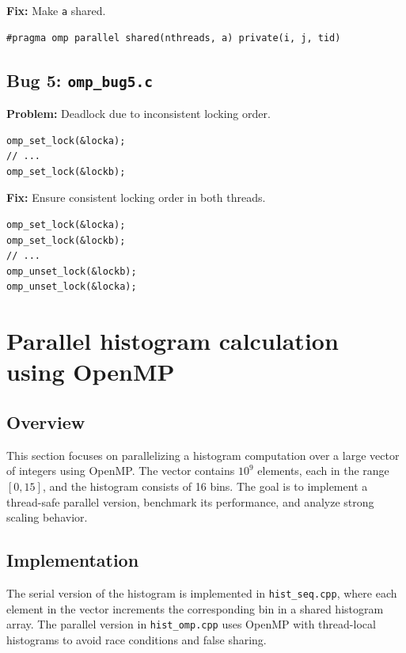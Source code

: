\documentclass[unicode,11pt,a4paper,oneside,numbers=endperiod,openany]{scrartcl}
\begin{document}
\textbf{Fix:} Make \texttt{a} shared.

\begin{lstlisting}[caption=Corrected Code]
#pragma omp parallel shared(nthreads, a) private(i, j, tid)
\end{lstlisting}

\subsection{Bug 5: \texttt{omp\_bug5.c}}

\textbf{Problem:} Deadlock due to inconsistent locking order.

\begin{lstlisting}[caption=Buggy Code]
omp_set_lock(&locka);
// ...
omp_set_lock(&lockb);
\end{lstlisting}

\textbf{Fix:} Ensure consistent locking order in both threads.

\begin{lstlisting}[caption=Corrected Code]
omp_set_lock(&locka);
omp_set_lock(&lockb);
// ...
omp_unset_lock(&lockb);
omp_unset_lock(&locka);
\end{lstlisting}

\newpage
\section{Parallel histogram calculation using OpenMP }

\subsection{Overview}
This section focuses on parallelizing a histogram computation over a large vector of integers using OpenMP. The vector contains $10^9$ elements, each in the range $[0, 15]$, and the histogram consists of 16 bins. The goal is to implement a thread-safe parallel version, benchmark its performance, and analyze strong scaling behavior.

\subsection{Implementation}
The serial version of the histogram is implemented in \texttt{hist\_seq.cpp}, where each element in the vector increments the corresponding bin in a shared histogram array. The parallel version in \texttt{hist\_omp.cpp} uses OpenMP with thread-local histograms to avoid race conditions and false sharing.
\end{document}
